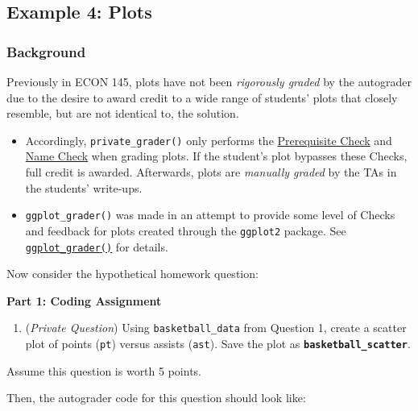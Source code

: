 \documentclass[
  12pt,
]{book}
\providecommand{\tightlist}{%
  \setlength{\itemsep}{0pt}\setlength{\parskip}{0pt}}
\begin{document}
\subsection*{Example 4: Plots}\label{private_grader-plots}

\subsubsection*{Background}\label{background}

Previously in ECON 145, plots have not been \emph{rigorously graded} by the autograder due to the desire to award credit to a wide range of students' plots that closely resemble, but are not identical to, the solution.

\begin{itemize}
\item
  Accordingly, \texttt{private\_grader()} only performs the \hyperref[Prerequisite-Check]{Prerequisite Check} and \hyperref[Name-Check]{Name Check} when grading plots. If the student's plot bypasses these Checks, full credit is awarded. Afterwards, plots are \emph{manually graded} by the TAs in the students' write-ups.
\item
  \texttt{ggplot\_grader()} was made in an attempt to provide some level of Checks and feedback for plots created through the \texttt{ggplot2} package. See \hyperref[ggplot_grader]{\texttt{ggplot\_grader()}} for details.
\end{itemize}

Now consider the hypothetical homework question:

\textbf{Part 1: Coding Assignment}

\begin{enumerate}
\def\labelenumi{\arabic{enumi}.}
\setcounter{enumi}{1}
\tightlist
\item
  (\emph{Private Question}) Using \texttt{basketball\_data} from Question 1, create a scatter plot of points (\texttt{pt}) versus assists (\texttt{ast}). Save the plot as \textbf{\texttt{basketball\_scatter}}.
\end{enumerate}

Assume this question is worth 5 points.

Then, the autograder code for this question should look like:
\end{document}
